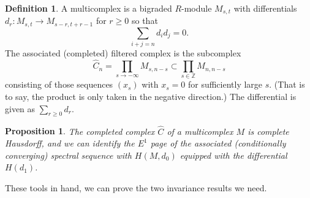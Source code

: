 \documentclass{memo-l}
\newtheorem{proposition}[theorem]{Proposition}
\theoremstyle{definition}
\newtheorem{definition}[theorem]{Definition}
\theoremstyle{remark}
\numberwithin{section}{chapter}
\numberwithin{equation}{chapter}
\begin{document}
\begin{definition}\label{multicomplex}A multicomplex is a bigraded $R$-module $M_{s,t}$ with differentials $d_r: M_{s,t} \to M_{s-r,t+r-1}$ for $r \geq 0$ so that $$\sum_{i+j = n} d_i d_j = 0.$$ The associated (completed) filtered complex is the subcomplex $$\hat C_n = \prod_{s \to -\infty} M_{s, n-s} \subset \prod_{s \in \mathbb Z} M_{n, n-s}$$ consisting of those sequences $(x_s)$ with $x_s = 0$ for sufficiently large $s$. (That is to say, the product is only taken in the negative direction.) The differential is given as $\sum_{r \geq 0} d_r$.
\end{definition}

\begin{proposition}The completed complex $\hat C$ of a multicomplex $M$ is complete Hausdorff, and we can identify the $E^1$ page of the associated (conditionally converging) spectral sequence with $H(M,d_0)$ equipped with the differential $H(d_1)$.
\end{proposition}

These tools in hand, we can prove the two invariance results we need.
\end{document}
